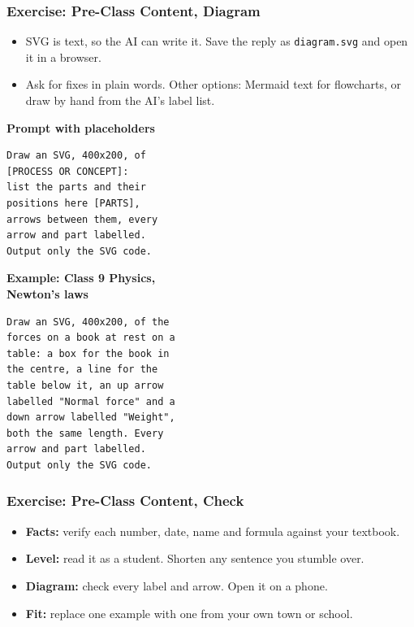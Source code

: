 \begin{frame}[fragile]\frametitle{Exercise: Pre-Class Content, Diagram}
\begin{itemize}
\item SVG is text, so the AI can write it. Save the reply as \texttt{diagram.svg} and open it in a browser.
\item Ask for fixes in plain words. Other options: Mermaid text for flowcharts, or draw by hand from the AI's label list.
\end{itemize}
\PairBegin
{\footnotesize\textbf{Prompt with placeholders}\\\mbox{}}
\begin{lstlisting}[language={},numbers=none]
Draw an SVG, 400x200, of
[PROCESS OR CONCEPT]:
list the parts and their
positions here [PARTS],
arrows between them, every
arrow and part labelled.
Output only the SVG code.
\end{lstlisting}
\PairMid
{\footnotesize\textbf{Example: Class 9 Physics,\\ Newton's laws}}
\begin{lstlisting}[language={},numbers=none]
Draw an SVG, 400x200, of the
forces on a book at rest on a
table: a box for the book in
the centre, a line for the
table below it, an up arrow
labelled "Normal force" and a
down arrow labelled "Weight",
both the same length. Every
arrow and part labelled.
Output only the SVG code.
\end{lstlisting}
\PairEnd
\end{frame}

\begin{frame}[fragile]\frametitle{Exercise: Pre-Class Content, Check}
\begin{itemize}
\item \textbf{Facts:} verify each number, date, name and formula against your textbook.
\item \textbf{Level:} read it as a student. Shorten any sentence you stumble over.
\item \textbf{Diagram:} check every label and arrow. Open it on a phone.
\item \textbf{Fit:} replace one example with one from your own town or school.
\end{itemize}
\end{frame}


